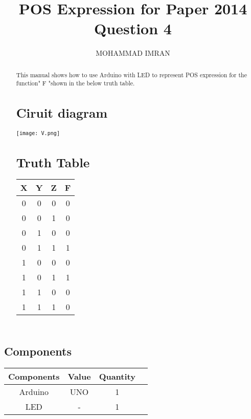 \documentclass{article}
\title{POS Expression for Paper 2014 Question 4}
\author{MOHAMMAD IMRAN}
\begin{document}
\maketitle
\begin{multicols}{2}
\tableofcontents
\vspace{16mm}

\begin{abstract}
This manual shows how to use Arduino with LED to represent POS expression for the function" F "shown in the  below truth table. \\
 
 \vspace{7mm}
 \centering
 \section{Ciruit diagram}
 
\texttt{[image: V.png]}

\section{Truth Table}

 \begin{tabular}{ |c |c |c |c |}
 \hline
 X  &  Y  &  Z  &  F\\
 \hline
 0  &  0  &  0  &  0\\
 \hline
 0  &  0  &  1  &  0\\
 \hline
 0  &  1  &  0  &  0\\
 \hline
 0  &  1  &  1  &  1\\
 \hline
 1  &  0  &  0  &  0\\
 \hline
 1  &  0  &  1  &  1\\
 \hline
 1  &  1  &  0  &  0\\
 \hline
 1  &  1  &  1  &  0\\
 \hline
 \end{tabular}
 \end{abstract}
 
\section{Components}

    \begin{tabular}{ |c |c |c |c |}
\hline
\textbf{Components} & \textbf{Value} & \textbf{Quantity} \\
\hline
 Arduino & UNO & 1 \\  
 LED & - & 1 \\
 \hline
 \end{tabular}
 \vspace{3mm}
 

\end{multicols}
\end{document}
